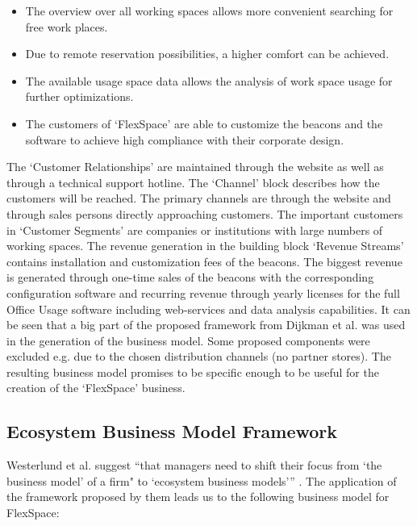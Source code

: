 		\begin{itemize}
			\item The overview over all working spaces allows more convenient searching for free work places.
			\item Due to remote reservation possibilities, a higher comfort can be achieved. 
			\item The available usage space data allows the analysis of work space usage for further optimizations.
			\item The customers of `FlexSpace' are able to customize the beacons and the software to achieve high compliance with their corporate design.  
		\end{itemize}  

		The `Customer Relationships' are maintained through the website as well as through a technical support hotline. The `Channel' block describes how the customers will be reached. The primary channels are through the website and through sales persons directly approaching customers. The important customers in `Customer Segments' are companies or institutions with large numbers of working spaces. The revenue generation in the building block `Revenue Streams' contains installation and customization fees of the beacons. The biggest revenue is generated through one-time sales of the beacons with the corresponding configuration software and recurring revenue through yearly licenses for the full Office Usage software including web-services and data analysis capabilities. It can be seen that a big part of the proposed framework from Dijkman et al. was used in the generation of the business model. Some proposed components were excluded e.g. due to the chosen distribution channels (no partner stores). The resulting business model promises to be specific enough to be useful for the creation of the `FlexSpace' business. 

	\subsection{Ecosystem Business Model Framework}
		Westerlund et al. suggest ``that managers need to shift their focus from `the business model' of a firm" to `ecosystem business models''' \cite[p.~8]{westerlund}. The application of the framework proposed by them leads us to the following business model for FlexSpace:

